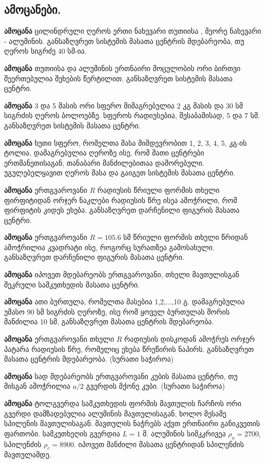 \documentclass{book}
\begin{document}
\subsection{ამოცანები.}
\textbf{ამოცანა} ცილინდრული ღეროს ერთი ნახევარი თუთიისა , მეორე ნახევარი - ალუმინის. განსაზღვრეთ სისტემის მასათა ცენტრის მდებარეობა, თუ ღეროს სიგრძე 40 სმ-ია.

\textbf{ამოცანა} თუთიისა და ალუმინის ერთნაირი მოცულობის ორი ბირთვი შეერთებულია შეხების წერტილით. განსაზღვრეთ სისტემის მასათა ცენტრი.

\textbf{ამოცანა} 3 და 5 მასის ორი სფერო მიმაგრებულია 2 კგ მასის და 30 სმ სიგრძის ღეროს ბოლოებზე. სფეროს რადიუსებია, შესაბამისად, 5 და 7 სმ. განსაზღვრეთ სისტემის მასათა ცენტრი.

\textbf{ამოცანა}  ხუთი სფერო, რომელთა მასა მიმდევრობით 1, 2, 3, 4, 5, კგ-ის ტოლია, დამაგრებულია ღეროზე ისე, რომ მათი ცენტრები ერთმანეთისაგან, თანაბარი მანძილებითაა დაშორებული. უგულებელყავით ღეროს მასა და გაიგეთ სისტემის მასათა ცენტრი.

\textbf{ამოცანა} ერთგვაროვანი $R$ რადიუსის წრიული ფორმის თხელი ფირფიტიდან ორჯერ ნაკლები რადიუსის წრე ისეა ამოჭრილი, რომ ფირფიტის კიდეს ეხება. განსაზღვრეთ დარჩენილი ფიგურის მასათა ცენტრი.

\textbf{ამოცანა} ერთგვაროვანი $R = 105.6$ სმ წრიული ფორმის თხელი წრიდან ამოჭრილია კვადრატი ისე, როგორც სურათზეა გამოსახული.
განსაზღვრეთ დარჩენილი ფიგურის მასათა ცენტრი.

\textbf{ამოცანა} იპოვეთ მდებარეობს ერთგვაროვანი, თხელი მავთულისგან შეკრული სამკუთხედის მასათა ცენტრი.

\textbf{ამოცანა} ათი ბურთულა, რომელთა მასებია 1,2,...,10 გ. დამაგრებულია უმასო 90 სმ სიგრძის ღეროზე, ისე რომ ყოველ ბურთულას შორის მანძილია 10 სმ, განსაზღვრეთ მასათა ცენტრის მდებარეობა.

\textbf{ამოცანა} ერთგვაროვანი თხელი $R$ რადიუსის დისკოდან ამოჭრეს ორჯერ პატარა რადიუსის წრე, რომელიც ეხება წრეწირის ნაპირს. განსაზღვრეთ მასათა ცენტრის მდებარეობა. (სურათი საჭიროა)

\textbf{ამოცანა} სად მდებარეობს ერთგვაროვანი კუბის მასათა ცენტრი, თუ მისგან ამოჭრილია $a/2$ გვერდის მქონე კუბი. (სურათი საჭიროა)

\textbf{ამოცანა} ტოლგვერდა სამკუთხედის ფორმის მავთულის ჩარჩოს ორი გვერდი დამზადებულია ალუმინის მავთულისაგან, ხოლო მესამე სპილენის მავთულისაგან. მავთულის ნაჭრებს აქვთ ერთნაირი განიკვეთის ფართობი. სამკუთხეღის გვერდია $L = 1$ მ. ალუმინის სიმკკრივეა $\rho_a = 2700$, სპილენძის $\rho_c = 8900$. იპოვეთ მანძილი მასათა ცენტრიდან სპილენძის მავთულამდე.
\end{document}
